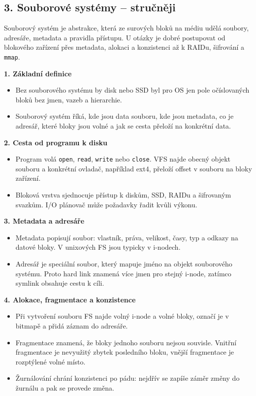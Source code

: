 
\subsection*{3. Souborové systémy -- stručněji}
Souborový systém je abstrakce, která ze surových bloků na médiu udělá soubory, adresáře, metadata a pravidla přístupu. U otázky je dobré postupovat od blokového zařízení přes metadata, alokaci a konzistenci až k RAIDu, šifrování a \texttt{mmap}.

\textbf{1. Základní definice}
\begin{itemize}
  \item Bez souborového systému by disk nebo SSD byl pro OS jen pole očíslovaných bloků bez jmen, vazeb a hierarchie.
  \item Souborový systém říká, kde jsou data souboru, kde jsou metadata, co je adresář, které bloky jsou volné a jak se cesta přeloží na konkrétní data.
\end{itemize}

\textbf{2. Cesta od programu k disku}
\begin{itemize}
  \item Program volá \texttt{open}, \texttt{read}, \texttt{write} nebo \texttt{close}. VFS najde obecný objekt souboru a konkrétní ovladač, například ext4, přeloží offset v souboru na bloky zařízení.
  \item Bloková vrstva sjednocuje přístup k diskům, SSD, RAIDu a šifrovaným svazkům. I/O plánovač může požadavky řadit kvůli výkonu.
\end{itemize}

\textbf{3. Metadata a adresáře}
\begin{itemize}
  \item Metadata popisují soubor: vlastník, práva, velikost, časy, typ a odkazy na datové bloky. V unixových FS jsou typicky v i-nodech.
  \item Adresář je speciální soubor, který mapuje jméno na objekt souborového systému. Proto hard link znamená více jmen pro stejný i-node, zatímco symlink obsahuje cestu k cíli.
\end{itemize}

\textbf{4. Alokace, fragmentace a konzistence}
\begin{itemize}
  \item Při vytvoření souboru FS najde volný i-node a volné bloky, označí je v bitmapě a přidá záznam do adresáře.
  \item Fragmentace znamená, že bloky jednoho souboru nejsou souvisle. Vnitřní fragmentace je nevyužitý zbytek posledního bloku, vnější fragmentace je rozptýlené volné místo.
  \item Žurnálování chrání konzistenci po pádu: nejdřív se zapíše záměr změny do žurnálu a pak se provede změna.
\end{itemize}

